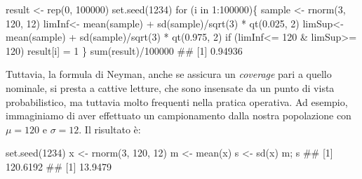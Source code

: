\documentclass[a4paper,12pt,oneside]{book}
\newenvironment{Shaded}{}{}
\newcommand{\KeywordTok}[1]{#1}
\newcommand{\DecValTok}[1]{#1}
\newcommand{\FloatTok}[1]{#1}
\newcommand{\StringTok}[1]{#1}
\newcommand{\CommentTok}[1]{#1}
\newcommand{\ControlFlowTok}[1]{#1}
\newcommand{\OperatorTok}[1]{#1}
\newcommand{\NormalTok}[1]{#1}
\begin{document}
\begin{Shaded}
\begin{Highlighting}[]
\NormalTok{result <-}\StringTok{ }\KeywordTok{rep}\NormalTok{(}\DecValTok{0}\NormalTok{, }\DecValTok{100000}\NormalTok{)}
\KeywordTok{set.seed}\NormalTok{(}\DecValTok{1234}\NormalTok{)}
\ControlFlowTok{for}\NormalTok{ (i }\ControlFlowTok{in} \DecValTok{1}\OperatorTok{:}\DecValTok{100000}\NormalTok{)\{}
\NormalTok{  sample <-}\StringTok{ }\KeywordTok{rnorm}\NormalTok{(}\DecValTok{3}\NormalTok{, }\DecValTok{120}\NormalTok{, }\DecValTok{12}\NormalTok{)}
\NormalTok{  limInf<-}\StringTok{ }\KeywordTok{mean}\NormalTok{(sample) }\OperatorTok{+}\StringTok{ }\KeywordTok{sd}\NormalTok{(sample)}\OperatorTok{/}\KeywordTok{sqrt}\NormalTok{(}\DecValTok{3}\NormalTok{) }\OperatorTok{*}\StringTok{ }\KeywordTok{qt}\NormalTok{(}\FloatTok{0.025}\NormalTok{, }\DecValTok{2}\NormalTok{) }
\NormalTok{  limSup<-}\StringTok{ }\KeywordTok{mean}\NormalTok{(sample) }\OperatorTok{+}\StringTok{ }\KeywordTok{sd}\NormalTok{(sample)}\OperatorTok{/}\KeywordTok{sqrt}\NormalTok{(}\DecValTok{3}\NormalTok{) }\OperatorTok{*}\StringTok{ }\KeywordTok{qt}\NormalTok{(}\FloatTok{0.975}\NormalTok{, }\DecValTok{2}\NormalTok{) }
  \ControlFlowTok{if}\NormalTok{ (limInf}\OperatorTok{<=}\StringTok{ }\DecValTok{120} \OperatorTok{&}\StringTok{ }\NormalTok{limSup}\OperatorTok{>=}\StringTok{ }\DecValTok{120}\NormalTok{) result[i] =}\StringTok{ }\DecValTok{1}
\NormalTok{\}}
\KeywordTok{sum}\NormalTok{(result)}\OperatorTok{/}\DecValTok{100000}
\CommentTok{## [1] 0.94936}
\end{Highlighting}
\end{Shaded}

Tuttavia, la formula di Neyman, anche se assicura un \emph{coverage} pari a quello nominale, si presta a cattive letture, che sono insensate da un punto di vista probabilistico, ma tuttavia molto frequenti nella pratica operativa. Ad esempio, immaginiamo di aver effettuato un campionamento dalla nostra popolazione con \(\mu = 120\) e \(\sigma = 12\). Il risultato è:

\begin{Shaded}
\begin{Highlighting}[]
\KeywordTok{set.seed}\NormalTok{(}\DecValTok{1234}\NormalTok{)}
\NormalTok{x <-}\StringTok{ }\KeywordTok{rnorm}\NormalTok{(}\DecValTok{3}\NormalTok{, }\DecValTok{120}\NormalTok{, }\DecValTok{12}\NormalTok{)}
\NormalTok{m <-}\StringTok{ }\KeywordTok{mean}\NormalTok{(x)}
\NormalTok{s <-}\StringTok{ }\KeywordTok{sd}\NormalTok{(x)}
\NormalTok{m; s}
\CommentTok{## [1] 120.6192}
\CommentTok{## [1] 13.9479}
\end{Highlighting}
\end{Shaded}
\end{document}
